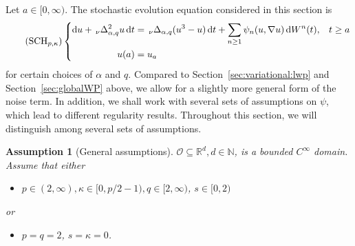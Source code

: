 \documentclass[reqno]{amsart}
\newtheorem{assumption}[Satz]{Assumption}
\newcommand{\N}{\mathbb{N}}
\newcommand{\R}{\mathbb{R}}
\newcommand{\sO}{\mathscr{O}}
\newcommand{\seq}{\subseteq}
\newcommand{\1}{\mathbf{1}}
\newcommand{\dd}{\ensuremath{\mathrm{d}}}
\begin{document}
Let $a\in [0,\infty)$. The stochastic evolution equation considered in this section is
\begin{equation}\tag{$\text{SCH}_{p, \kappa}$}\label{SCH}
    \left\{
    \begin{aligned}
        \dd u +\,_\nu\Delta_{\alpha,q}^2 u\, \dd t&= \,_\nu\Delta_{\alpha,q}(u^3-u)\,\dd t +\sum_{n\ge1}\psi_n(u,\nabla u)\, \dd W^n(t), &t\ge a\\
        u(a)&=u_a&
    \end{aligned}
    \right.
\end{equation}
for certain choices of $\alpha$ and $q$. 
Compared to Section~\ref{sec:variational:lwp} and Section~\ref{sec:globalWP} above, we allow for a slightly more general form of the noise term.
In addition, we shall work with several sets of assumptions on $\psi$, which lead to different regularity results. 
	Throughout this section, we will distinguish among several sets of assumptions.
	\begin{assumption}[General assumptions]\label{Assumption:general}
     $\sO \seq \R^d,d\in\N$, is a bounded $C^\infty$ domain.
		Assume that either
		\begin{itemize}
		\item 	$p\in (2,\infty), \kappa\in [0,p/2-1), q\in [2,\infty)$, $s\in [0,2)$
		\end{itemize}
		or 
		\begin{itemize}
			\item $p=q=2$, $s=\kappa=0$. 
		\end{itemize}
	\end{assumption}
\end{document}
